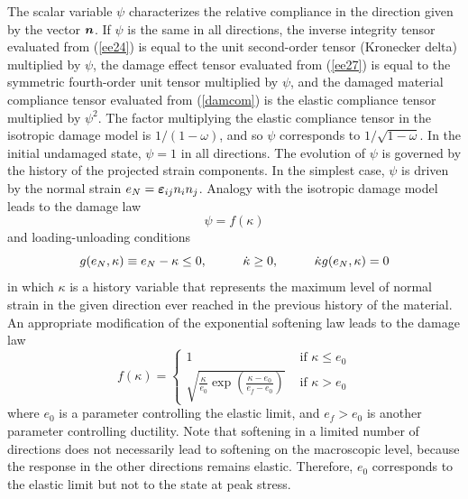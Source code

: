 \documentclass[epsf,a4paper]{article}
\newcommand{\mbf}[1]{\mbox{\boldmath$#1$}}
\newcommand {\eps} {\mbf{\varepsilon}}
\begin{document}
The scalar variable $\psi$ characterizes the relative compliance
in the direction given by the vector $\mbf{n}$. 
If $\psi$ is the same in all directions,
the inverse integrity tensor  evaluated from (\ref{ee24})
is equal to the unit second-order tensor (Kronecker delta) multiplied
by $\psi$, the damage effect tensor evaluated from (\ref{ee27})
is equal to the symmetric fourth-order unit tensor multiplied
by $\psi$, 
and the damaged
material compliance tensor evaluated from (\ref{damcom}) is the
elastic compliance tensor multiplied by $\psi^2$. The factor multiplying
the elastic compliance tensor in the 
isotropic damage model is $1/(1-\omega)$, and so $\psi$ corresponds
to  $1/\sqrt{1-\omega}$. In the initial undamaged state,
$\psi=1$ in all directions.  The evolution of $\psi$
is governed by the history of the projected strain components.
In the simplest case, $\psi$ is driven by the normal strain
$e_N=\eps_{ij}n_in_j$. Analogy with the isotropic damage model
leads to the damage law
\begin{equation}
\psi=f(\kappa)
\end{equation}
and loading-unloading conditions
\begin{equation}
g(e_N,\kappa)\equiv e_N-\kappa\le 0, \hskip 10mm
\dot{\kappa}\ge 0, \hskip 10mm
\dot{\kappa}g(e_N,\kappa)=0
\end{equation}
in which $\kappa$ is a history variable that represents the maximum
level of normal strain in the given direction ever reached in the
previous history of the material. An appropriate modification
of the exponential softening
law leads to the damage law
\begin{equation}
\label{expsoft2}
f(\kappa)=\left\{
\begin{array}{ll}
1 & \mbox{ if } \kappa\le e_0
\\
\sqrt{\frac{\kappa}{e_0}\exp\left(\frac{\kappa-e_0}{e_f-e_0}\right)} 
& \mbox{ if } \kappa>e_0
\end{array}
\right.
\end{equation}
where $e_0$ is a parameter controlling the elastic limit, and $e_f>e_0$
is another parameter controlling ductility. 
Note that softening in a limited number of directions does not necessarily
lead to softening on the macroscopic level, because the response
in the other directions remains elastic. Therefore, $e_0$ corresponds
to the elastic limit but not to the state at peak stress.
\end{document}

